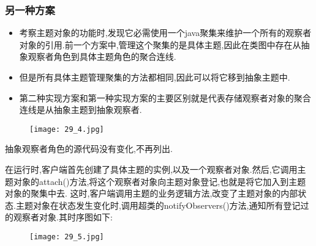 \documentclass[../main.tex]{subfiles}
\begin{document}
\subsubsection{另一种方案}
\begin{itemize}
  \item 考察主题对象的功能时,发现它必需使用一个java聚集来维护一个所有的观察者对象的引用.前一个方案中,管理这个聚集的是具体主题,因此在类图中存在从抽象观察者角色到具体主题角色的聚合连线.
  \item 但是所有具体主题管理聚集的方法都相同,因此可以将它移到抽象主题中.
  \item 第二种实现方案和第一种实现方案的主要区别就是代表存储观察者对象的聚合连线是从抽象主题到抽象观察者.
\end{itemize}
%
\begin{figure}[H]
  \texttt{[image: 29\_4.jpg]}
\end{figure}
%


%
抽象观察者角色的源代码没有变化,不再列出.
%

%
在运行时,客户端首先创建了具体主题的实例,以及一个观察者对象.然后,它调用主题对象的attach()方法,将这个观察者对象向主题对象登记,也就是将它加入到主题对象的聚集中去.
这时,客户端调用主题的业务逻辑方法,改变了主题对象的内部状态.主题对象在状态发生变化时,调用超类的notifyObservers()方法,通知所有登记过的观察者对象.其时序图如下:
%
\begin{figure}[H]
  \texttt{[image: 29\_5.jpg]}
\end{figure}
%
\end{document}
